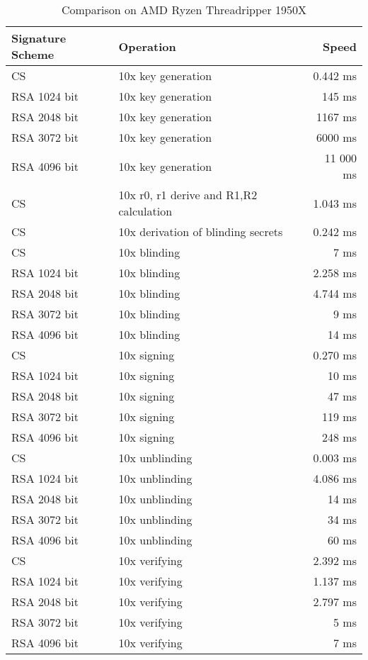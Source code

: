 \begin{table}[ht]
    \centering
    \setupBfhTabular
    \begin{tabular}{llr}
        \rowcolor{BFH-tablehead}
        \textbf{Signature Scheme} & \textbf{Operation} & \textbf{Speed} \\\hline
        CS & 10x key generation & 0.442 ms \\\hline
        RSA 1024 bit & 10x key generation & 145 ms \\\hline
        RSA 2048 bit & 10x key generation & 1167 ms \\\hline
        RSA 3072 bit & 10x key generation & 6000 ms \\\hline
        RSA 4096 bit & 10x key generation & 11 000 ms \\\hline
        \hline
        CS & 10x r0, r1 derive and R1,R2 calculation &  1.043 ms \\\hline
        CS & 10x derivation of blinding secrets & 0.242 ms \\\hline
        CS & 10x blinding & 7 ms \\\hline
        RSA 1024 bit & 10x blinding &  2.258 ms \\\hline
        RSA 2048 bit & 10x blinding &  4.744 ms \\\hline
        RSA 3072 bit & 10x blinding &  9 ms \\\hline
        RSA 4096 bit & 10x blinding &  14 ms \\\hline
        \hline
        CS & 10x signing &  0.270 ms \\\hline
        RSA 1024 bit & 10x signing &  10 ms \\\hline
        RSA 2048 bit & 10x signing &  47 ms \\\hline
        RSA 3072 bit & 10x signing &  119 ms \\\hline
        RSA 4096 bit & 10x signing &  248 ms \\\hline
        \hline
        CS & 10x unblinding & 0.003 ms \\\hline
        RSA 1024 bit & 10x unblinding &  4.086 ms \\\hline
        RSA 2048 bit & 10x unblinding &  14 ms \\\hline
        RSA 3072 bit & 10x unblinding &  34 ms \\\hline
        RSA 4096 bit & 10x unblinding &  60 ms \\\hline
        \hline
        CS & 10x verifying & 2.392 ms \\\hline
        RSA 1024 bit & 10x verifying &  1.137 ms \\\hline
        RSA 2048 bit & 10x verifying &  2.797 ms \\\hline
        RSA 3072 bit & 10x verifying &  5 ms \\\hline
        RSA 4096 bit & 10x verifying &  7 ms \\\hline
    \end{tabular}
    \caption{Comparison on AMD Ryzen Threadripper 1950X}
    \label{tab:comp-sign-amd-threadripper}
\end{table}

